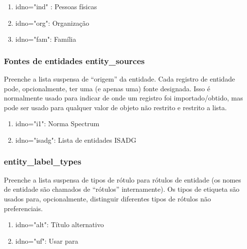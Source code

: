 \begin{enumerate}
	\item idno="ind" : Pessoas físicas
	\item idno="org": Organização
	\item idno="fam": Família
\end{enumerate}

\subsubsection{Fontes de entidades entity\_sources}

Preenche a lista suspensa de ``origem'' da entidade. Cada registro de entidade pode, opcionalmente, ter uma (e apenas uma) fonte designada. Isso é normalmente usado para indicar de onde um registro foi importado/obtido, mas pode ser usado para qualquer valor de objeto não restrito e restrito a lista.

\begin{enumerate}
	\item idno="i1": Norma Spectrum
	\item idno="isadg": Lista de entidades ISADG
\end{enumerate}

\subsubsection{entity\_label\_types}
Preenche a lista suspensa de tipos de rótulo para rótulos de entidade (os nomes de entidade são chamados de ``rótulos'' internamente). Os tipos de etiqueta são usados para, opcionalmente, distinguir diferentes tipos de rótulos não preferenciais.

\begin{enumerate}
	\item idno="alt": Título alternativo
	\item idno="uf": Usar para
\end{enumerate}

